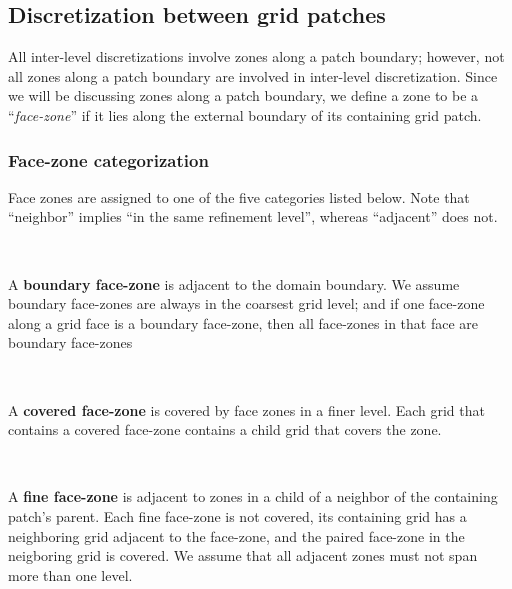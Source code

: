 \documentclass[10pt]{article}
\begin{document}
\subsection{Discretization between grid patches} \label{ss:discret-amr}

All inter-level discretizations involve zones along a patch boundary;
however, not all zones along a patch boundary are involved in
inter-level discretization.  Since we will be discussing zones along a
patch boundary, we define a zone to be a ``\textit{face-zone}'' if it
lies along the external boundary of its containing grid patch.


\subsubsection{Face-zone categorization}

Face zones are assigned to one of the five categories listed below.
Note that ``neighbor'' implies ``in the same refinement level'',
whereas ``adjacent'' does not.


\begin{minipage}{1in}
\end{minipage} \
\begin{minipage}{5.8in}
 A \textbf{boundary face-zone} is adjacent to the domain boundary.  We
assume boundary face-zones are always in the coarsest grid level; and
if one face-zone along a grid face is a boundary face-zone, then all
face-zones in that face are boundary face-zones
\end{minipage}

\begin{minipage}{1in}
\end{minipage} \
\begin{minipage}{5.8in}
A \textbf{covered face-zone} is covered by face zones in a finer
level.  Each grid that contains a covered face-zone contains a child
grid that covers the zone.
\end{minipage}

\begin{minipage}{1in}
\end{minipage} \
\begin{minipage}{5.8in}
A \textbf{fine face-zone} is adjacent to zones in a child of a
neighbor of the containing patch's parent.  Each fine face-zone is not
covered, its containing grid has a neighboring grid adjacent to the
face-zone, and the paired face-zone in the neigboring grid is covered.
We assume that all adjacent zones must not span more than one level.
\end{minipage}
\end{document}
